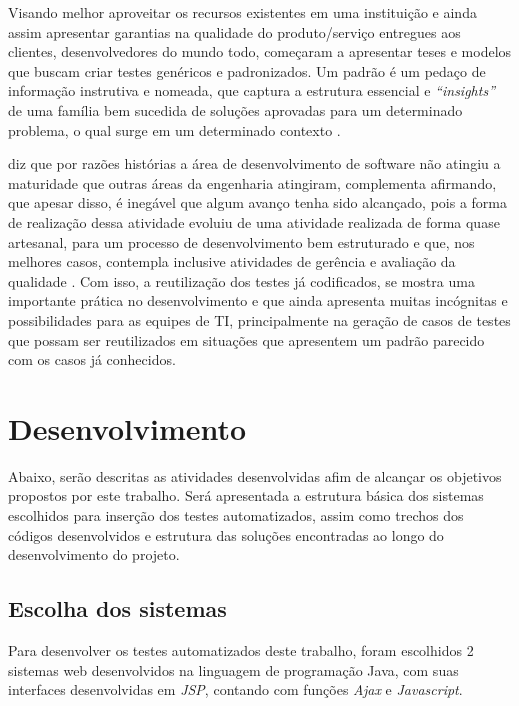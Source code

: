 \documentclass[tg]{mdtufsm}
\begin{document}
Visando melhor aproveitar os recursos existentes em uma instituição e ainda assim apresentar garantias na qualidade do produto/serviço entregues aos clientes, desenvolvedores do mundo todo, começaram a apresentar
teses e modelos que buscam criar testes genéricos e padronizados. Um padrão é um pedaço de informação instrutiva e nomeada, que captura a estrutura essencial
e \emph{“insights”} de uma família bem sucedida de soluções aprovadas para um determinado problema, o qual surge em um determinado contexto \cite{cagnin2004reuso}.

\citeauthor{guizzardi2000desenvolvimento} diz que por razões histórias a área de desenvolvimento de software não atingiu a maturidade que outras áreas da engenharia atingiram, complementa afirmando,
que apesar disso, é inegável que algum avanço tenha sido alcançado, pois a forma de realização dessa atividade evoluiu de uma atividade realizada de forma quase artesanal, para um processo de
desenvolvimento bem estruturado e que, nos melhores casos, contempla inclusive atividades de gerência e avaliação da qualidade \cite{guizzardi2000desenvolvimento}.
Com isso, a reutilização dos testes já codificados, se mostra uma importante prática no desenvolvimento e que ainda apresenta muitas incógnitas e possibilidades para as equipes de TI,
principalmente na geração de casos de testes que possam ser reutilizados em situações que apresentem um padrão parecido com os casos já conhecidos.

\chapter{Desenvolvimento}

Abaixo, serão descritas as atividades desenvolvidas afim de alcançar os objetivos propostos por este trabalho. Será apresentada a estrutura básica dos sistemas escolhidos para inserção dos testes automatizados, assim como trechos dos códigos desenvolvidos e estrutura das soluções encontradas ao longo do desenvolvimento do projeto.

\section{Escolha dos sistemas}

Para desenvolver os testes automatizados deste trabalho, foram escolhidos 2 sistemas web desenvolvidos na linguagem de programação Java, com suas interfaces desenvolvidas em \emph{JSP}, contando com funções \emph{Ajax} e \emph{Javascript}.
\end{document}
